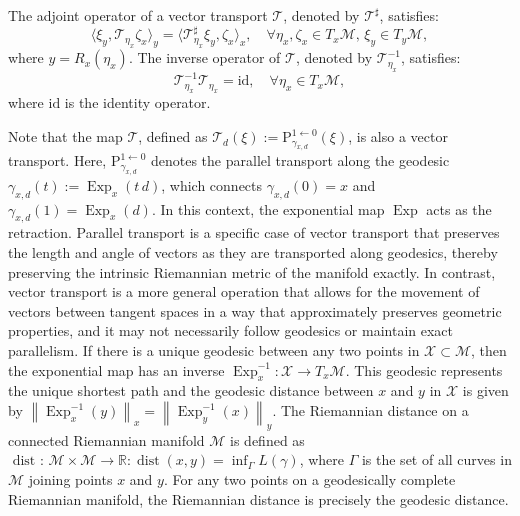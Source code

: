 \documentclass[pdflatex,sn-mathphys-num]{sn-jnl}%
\theoremstyle{definition} %
\theoremstyle{remark} %
\begin{document}
The adjoint operator of a vector transport \(\mathcal{T}\), denoted by \(\mathcal{T}^{\sharp}\), satisfies:  
\[
\langle \xi_y, \mathcal{T}_{\eta_x} \zeta_x \rangle_y = \langle \mathcal{T}_{\eta_x}^{\sharp} \xi_y, \zeta_x \rangle_x, \quad \forall \eta_x, \zeta_x \in T_x \mathcal{M}, \, \xi_y \in T_y \mathcal{M},
\]  
where \( y = R_x(\eta_x) \).  
The inverse operator of \(\mathcal{T}\), denoted by \(\mathcal{T}_{\eta_x}^{-1}\), satisfies:  
\[
\mathcal{T}_{\eta_x}^{-1} \mathcal{T}_{\eta_x} = \text{id}, \quad \forall \eta_x \in T_x \mathcal{M},
\]  
where \(\text{id}\) is the identity operator.


Note that the map \(\mathcal{T}\), defined as \(\mathcal{T}_d(\xi) := \mathrm{P}_{\gamma_{x,d}}^{1 \leftarrow 0}(\xi)\), is also a vector transport. Here, \(\mathrm{P}_{\gamma_{x,d}}^{1 \leftarrow 0}\) denotes the parallel transport along the geodesic \(\gamma_{x,d}(t) := \operatorname{Exp}_x(t \, d)\), which connects \(\gamma_{x,d}(0) = x\) and \(\gamma_{x,d}(1) = \operatorname{Exp}_x(d)\). In this context, the exponential map \(\operatorname{Exp}\) acts as the retraction.
Parallel transport is a specific case of vector transport that preserves the length and angle of vectors as they are transported along geodesics, thereby preserving the intrinsic Riemannian metric of the manifold exactly. In contrast, vector transport is a more general operation that allows for the movement of vectors between tangent spaces in a way that approximately preserves geometric properties, and it may not necessarily follow geodesics or maintain exact parallelism.
If there is a unique geodesic between any two points in \(\mathcal{X} \subset \mathcal{M}\), then the exponential map has an inverse \(\operatorname{Exp}_x^{-1} \colon \mathcal{X} \rightarrow T_x \mathcal{M}\). This geodesic represents the unique shortest path and the geodesic distance between \(x\) and \(y\) in \(\mathcal{X}\) is given by \(\left\|\operatorname{Exp}_x^{-1}(y)\right\|_x = \left\|\operatorname{Exp}_y^{-1}(x)\right\|_y\).
The Riemannian distance on a connected Riemannian manifold $\mathcal{M}$ is defined as
$
\text { dist : } \mathcal{M} \times \mathcal{M} \rightarrow \mathbb{R}: \operatorname{dist}(x, y)=\inf _{\Gamma} L(\gamma)
$, where $\Gamma$ is the set of all curves in $\mathcal{M}$ joining points $x$ and $y$. 
For any two points on a geodesically complete Riemannian manifold, the Riemannian distance is precisely the geodesic distance.
\end{document}
